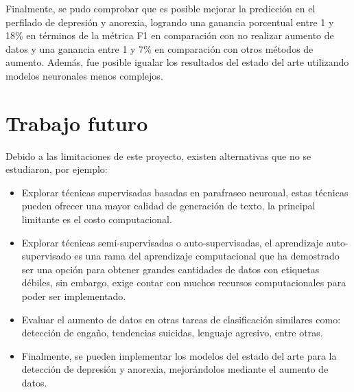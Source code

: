 Finalmente, se pudo comprobar que es posible mejorar la predicción en el perfilado de depresión y anorexia, logrando una ganancia porcentual entre 1 y 18\% en términos de la métrica F1 en comparación con no realizar aumento de datos y una ganancia entre 1 y 7\% en comparación con otros métodos de aumento. Además, fue posible igualar los resultados del estado del arte utilizando modelos neuronales menos complejos.


\section{Trabajo futuro}

Debido a las limitaciones de este proyecto, existen alternativas que no se estudiaron, por ejemplo:

\begin{itemize}
    \item Explorar técnicas supervisadas basadas en parafraseo neuronal, estas técnicas pueden ofrecer una mayor calidad de generación de texto, la principal limitante es el costo computacional.
    
    \item Explorar técnicas semi-supervisadas o auto-supervisadas, el aprendizaje auto-supervisado es una rama del aprendizaje computacional que ha demostrado ser una opción para obtener grandes cantidades de datos con etiquetas débiles, sin embargo, exige contar con muchos recursos computacionales para poder ser implementado.
    
    \item Evaluar el aumento de datos en otras tareas de clasificación similares como: detección de engaño, tendencias suicidas, lenguaje agresivo, entre otras.
    
    \item Finalmente, se pueden implementar los modelos del estado del arte para la detección de depresión y anorexia, mejorándolos mediante el aumento de datos.
    
    
\end{itemize}


